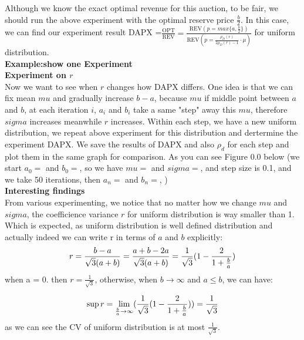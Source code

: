 Although we know the exact optimal revenue for this auction, to be fair, we should run the above experiment with the optimal reserve price $\frac{b}{2}$. In this case, we can find our experiment result DAPX =$\frac{\text{OPT}}{\text{REV}} = \frac{\text{REV}(p=max \{a,\frac{b}{2}\})}{\text{REV}(p=\frac{\rho_{D}(r)}{2\rho_{D}(r)-1}\cdot \mu)}$ for uniform distribution. \\
\textbf{Example:show one Experiment}\\
\textbf{Experiment on $r$}\\
Now we want to see when $r$ changes how DAPX differs. One idea is that we can fix mean $mu$ and gradually increase $b-a$, because $mu$ if middle point between $a$ and $b$, at each iteration $i$, $a_i$ and $b_i$ take a same "step" away this $mu$, therefore $sigma$ increases meanwhile $r$ increases. Within each step, we have a new uniform distribution, we repeat above experiment for this distribution and dertermine the experiment DAPX. We save  the results of DAPX and also $\rho_d$ for each step and plot them in the same graph for comparison. As you can see Figure 0.0 below
(we start $a_0 = $ and $b_0 = $, so we have $mu = $  and $sigma =$, and step size is 0.1, and we take 50 iterations, then $a_n =$ and $b_n=$,         )\\



\textbf{Interesting findings}\\
From various experimenting, we notice that no matter how we change $mu$ and $sigma$, the coefficience variance $r$ for uniform distribution is way smaller than 1. Which is expected, as uniform distribution is well defined distribution and actually indeed we can write r in terms of $a$ and $b$ explicitly:
\begin{equation}\notag
r = \frac {b-a}{\sqrt{3}(a+b)} = \frac {a+b-2a}{\sqrt{3}(a+b)} = \frac {1}{\sqrt{3}} (1-  \frac {2}{1+\frac{b}{a}})
\end{equation} 
when a = 0. then $r = \frac {1}{\sqrt{3}}$, otherwise, when $b \rightarrow \infty$ and $a\leqslant b$, we can have:

\begin{equation}\notag
\sup r = \displaystyle{\lim_{\frac{b}{a} \to \infty}}(\frac {1}{\sqrt{3}} (1-  \frac {2}{1+\frac{b}{a}})) = \frac {1}{\sqrt{3}}  
\end{equation} 
as we can see the CV of uniform distribution is at most $\frac {1}{\sqrt{3}}$.

